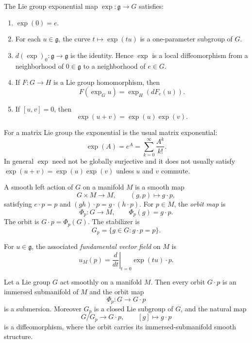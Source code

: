 \begin{proposition}
\label{proposition-exponential-properties}
The Lie group exponential map
$\exp:\mathfrak g\to G$ satisfies:
\begin{enumerate}
\item $\exp(0)=e$.
\item For each $u\in\mathfrak g$, the curve
$t\mapsto \exp(tu)$ is a one-parameter
subgroup of $G$.
\item $d(\exp)_0:\mathfrak g\to\mathfrak g$
is the identity. Hence $\exp$ is a local
diffeomorphism from a neighborhood of
$0\in\mathfrak g$ to a neighborhood of
$e\in G$.
\item If $F:G\to H$ is a Lie group
homomorphism, then
$$
F(\exp_G u)=\exp_H(dF_e(u)).
$$
\item If $[u,v]=0$, then
$$
\exp(u+v)=\exp(u)\exp(v).
$$
\end{enumerate}
\end{proposition}

\medskip\noindent
For a matrix Lie group the exponential is
the usual matrix exponential:
$$
\exp(A)=e^A=
\sum_{k=0}^\infty \frac{A^k}{k!}.
$$
In general $\exp$ need not be globally
surjective and it does not usually satisfy
$\exp(u+v)=\exp(u)\exp(v)$ unless $u$ and
$v$ commute.

\begin{definition}
\label{definition-lie-group-action}
A smooth left action of $G$ on a manifold
$M$ is a smooth map
$$
G\times M\to M,\qquad (g,p)\mapsto g\cdot p,
$$
satisfying $e\cdot p=p$ and
$(gh)\cdot p=g\cdot(h\cdot p)$.
For $p\in M$, the {\it orbit map} is
$$
\Phi_p:G\to M,
\qquad
\Phi_p(g)=g\cdot p.
$$
The orbit is $G\cdot p=\Phi_p(G)$.
The stabilizer is
$$
G_p=\{g\in G:g\cdot p=p\}.
$$
\end{definition}

\begin{definition}
\label{definition-fundamental-vector-field}
For $u\in\mathfrak g$, the associated
{\it fundamental vector field} on $M$ is
$$
u_M(p)=
\left.\frac{d}{dt}\right|_{t=0}
\exp(tu)\cdot p.
$$
\end{definition}

\begin{theorem}
\label{theorem-orbit-theorem-lie-actions}
Let a Lie group $G$ act smoothly on a
manifold $M$. Then every orbit $G\cdot p$ is
an immersed submanifold of $M$ and the orbit
map
$$
\Phi_p:G\to G\cdot p
$$
is a submersion. Moreover $G_p$ is a closed
Lie subgroup of $G$, and the natural map
$$
G/G_p\to G\cdot p,
\qquad
[g]\mapsto g\cdot p
$$
is a diffeomorphism, where the orbit carries
its immersed-submanifold smooth structure.
\end{theorem}

